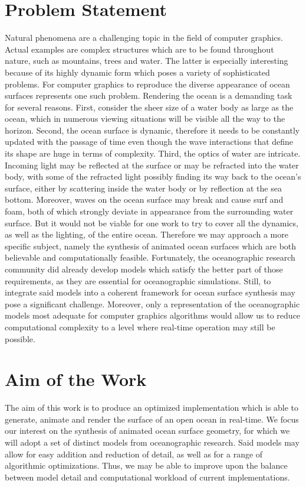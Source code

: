 \documentclass[a4paper,11pt,twoside]{memoir}
\begin{document}
\section{Problem Statement}
Natural phenomena are a challenging topic in the field of computer graphics.
Actual examples are complex structures which are to be found throughout nature,
such as mountains, trees and water. The latter is especially interesting
because of its highly dynamic form which poses a variety of sophisticated problems.
For computer graphics to reproduce the diverse appearance of ocean surfaces
represents one such problem.
Rendering the ocean is a demanding task for several reasons. First, consider the
sheer size of a water body as large as the ocean, which in numerous viewing
situations will be visible all the way to the horizon. Second, the ocean surface
is dynamic, therefore it needs to be constantly updated with the passage of time
even though the wave interactions that define its shape are huge in terms of complexity.
Third, the optics of water are intricate. Incoming light may be reflected at the
surface or may be refracted into the water body, with some of the refracted light
possibly finding its way back to the ocean's surface, either by scattering inside the water
body or by reflection at the sea bottom. Moreover, waves on the ocean surface may
break and cause surf and foam, both of which strongly deviate in appearance from
the surrounding water surface.
But it would not be viable for one work to try to cover all the dynamics, as well
as the lighting, of the entire ocean. Therefore we may approach a more specific
subject, namely the synthesis of animated ocean surfaces which are both believable
and computationally feasible. 
Fortunately, the oceanographic research community did already develop models
\citep[e.g.\ ][]{article:PiersonMoskowitz1964, article:Hasselman1973} which satisfy the
better part of those requirements, as they are essential for oceanographic simulations.
Still, to integrate said models into a coherent framework for ocean surface
synthesis may pose a significant challenge.
Moreover, only a representation of the oceanographic models most adequate for
computer graphics algorithms would allow us to reduce computational complexity to
a level where real-time operation may still be possible.
\section{Aim of the Work}
The aim of this work is to produce an optimized implementation which is able to generate,
animate and render the surface of an open ocean in real-time. We focus our interest
on the synthesis of animated ocean surface geometry, for which we will adopt
a set of distinct models from oceanographic research. Said models may allow for
easy addition and reduction of detail, as well as for a range of algorithmic
optimizations. Thus, we may be able to improve upon the balance between model detail
and computational workload of current implementations.
%
\end{document}
